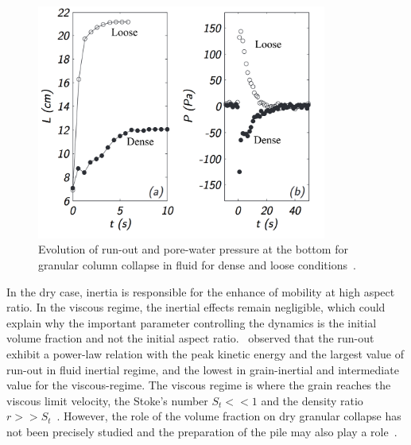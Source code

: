 \begin{figure}[htbp]
\centering
\includegraphics[width=0.85\textwidth]{Runout_PWP_Fluid_Exp}
\caption{Evolution of run-out and pore-water pressure at the bottom for 
granular column collapse in fluid for dense and loose 
conditions~\citep{Rondon2011}.}
\label{fig:Runout_PWP_Fluid_Exp}
\end{figure}

In the dry case, inertia is 
responsible for the enhance of mobility at high aspect ratio. In the viscous 
regime, the inertial effects 
remain negligible, which could explain why the important parameter controlling 
the dynamics is the initial volume fraction and not the initial aspect 
ratio.~\citet{Topin2011} observed that the run-out exhibit a power-law relation 
with the peak kinetic energy and the largest value of run-out in fluid inertial 
regime, and the lowest in grain-inertial and intermediate value for the 
viscous-regime. The viscous regime is where the grain reaches the viscous 
limit velocity, the Stoke's number $S_t << 1$ and the density ratio $r >> 
S_t$~\citep{CourrechDuPont2003}. However, the role of the volume fraction on 
dry granular collapse has not been precisely studied and the preparation of the 
pile may also play a role~\citet{Daerr1999a}.

